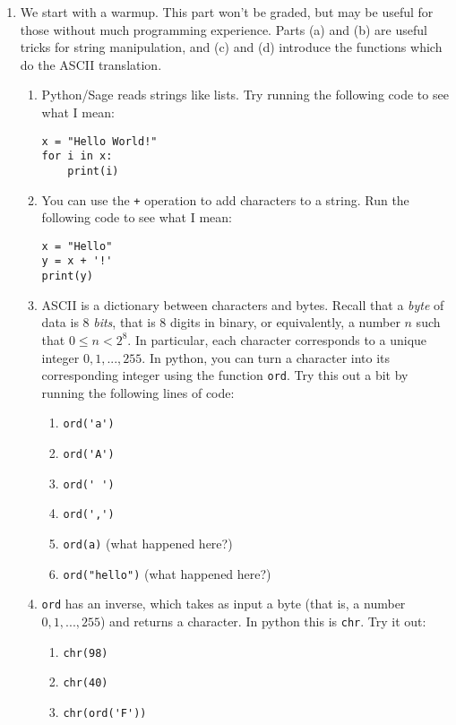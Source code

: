 \documentclass[11pt]{article}
\begin{document}
\begin{enumerate}
  \item{
  We start with a warmup.  This part won't be graded, but may be useful for those without much programming experience.  Parts (a) and (b) are useful tricks for string manipulation, and (c) and (d) introduce the functions which do the ASCII translation.
  \begin{enumerate}
    \item{
    Python/Sage reads strings like lists.  Try running the following code to see what I mean:
    \begin{verbatim}
x = "Hello World!"
for i in x:
    print(i)
    \end{verbatim}
    }
    \item{
    You can use the \verb|+| operation to add characters to a string.  Run the following code to see what I mean:
    \begin{verbatim}
x = "Hello"
y = x + '!'
print(y)
    \end{verbatim}
    }
    \item{
    ASCII is a dictionary between characters and bytes.  Recall that a \textit{byte} of data is 8 \textit{bits}, that is 8 digits in binary, or equivalently, a number $n$ such that $0\le n<2^8$.  In particular, each character corresponds to a unique integer $0,1,...,255$.  In python, you can turn a character into its corresponding integer using the function \verb|ord|.  Try this out a bit by running the following lines of code:
    \begin{enumerate}
      \item{\verb|ord('a')|}
      \item{\verb|ord('A')|}
      \item{\verb|ord(' ')|}
      \item{\verb|ord(',')|}
      \item{\verb|ord(a)| (what happened here?)}
      \item{\verb|ord("hello")| (what happened here?)}
    \end{enumerate}
    }
    \item{
    \verb|ord| has an inverse, which takes as input a byte (that is, a number $0,1,...,255$) and returns a character.  In python this is \verb|chr|.  Try it out:
    \begin{enumerate}
      \item{\verb|chr(98)|}
      \item{\verb|chr(40)|}
      \item{\verb|chr(ord('F'))|}

\end{enumerate}}
\end{enumerate}}
\end{enumerate}
\end{document}
